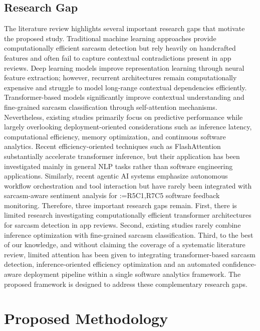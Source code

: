 \documentclass[a4paper,fleqn]{cas-sc}
\makeatletter
\newif\iftracked
\newcommand{\rv@setcolour}[1]{%
  \IfStrEq{#1}{R7C7}{\color{rvEdit}}{%
    \IfSubStr{#1}{R5}{\IfSubStr{#1}{R7}{\color{rvBoth}}{\color{rvFive}}}{\color{rvSeven}}}}
\newcommand{\rv@tag}[1]{\textsuperscript{\sffamily\bfseries\scriptsize[\StrSubstitute{#1}{,}{, }]}\,}
\newcommand{\rv@recordone}[1]{%
  \edef\rv@i{#1}%
  \ifcsdef{rv@n@\rv@i}{}{\csgdef{rv@n@\rv@i}{0}}%
  \csxdef{rv@n@\rv@i}{\the\numexpr\csuse{rv@n@\rv@i}+1\relax}%
  \begingroup\edef\@currentlabel{\rv@i}\label{rv:\rv@i:\csuse{rv@n@\rv@i}}\endgroup}
\newcommand{\rv@record}[1]{\@for\rv@id:=#1\do{\expandafter\rv@recordone\expandafter{\rv@id}}}
\DeclareRobustCommand{\rcdel}[2]{\rv@record{#1}\iftracked{\rv@setcolour{#1}\rv@tag{#1}\rv@strike{#2}}\else\unskip\fi}
\makeatother
\begin{document}
\subsection{Research Gap}
The literature review highlights several important research gaps that motivate the proposed study. Traditional machine learning approaches provide computationally efficient sarcasm detection but rely heavily on handcrafted features and often fail to capture contextual contradictions present in app reviews. Deep learning models improve representation learning through neural feature extraction; however, recurrent architectures remain computationally expensive and struggle to model long-range contextual dependencies efficiently. Transformer-based models significantly improve contextual understanding and fine-grained sarcasm classification through self-attention mechanisms. Nevertheless, existing studies primarily focus on predictive performance while largely overlooking deployment-oriented considerations such as inference latency, computational efficiency, memory optimization, and continuous software analytics. Recent efficiency-oriented techniques such as FlashAttention substantially accelerate transformer inference, but their application has been investigated mainly in general NLP tasks rather than software engineering applications. Similarly, recent agentic AI systems emphasize autonomous workflow orchestration and tool interaction but have rarely been integrated with sarcasm-aware sentiment analysis for \rcdel{R5C1,R7C5}{continuous} software feedback monitoring. Therefore, three important research gaps remain. First, there is limited research investigating computationally efficient transformer architectures for sarcasm detection in app reviews. Second, existing studies rarely combine inference optimization with fine-grained sarcasm classification. Third, to the best of our knowledge, and without claiming the coverage of a systematic literature review, limited attention has been given to integrating transformer-based sarcasm detection, inference-oriented efficiency optimization and an automated confidence-aware deployment pipeline within a single software analytics framework. The proposed framework is designed to address these complementary research gaps.

\section{Proposed Methodology}
\label{sec:method}
\end{document}
